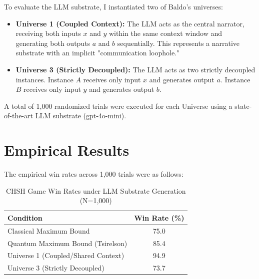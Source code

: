 \documentclass[12pt,a4paper]{article}
\begin{document}
To evaluate the LLM substrate, I instantiated two of Baldo's universes:

\begin{itemize}[nosep]
    \item \textbf{Universe 1 (Coupled Context):} The LLM acts as the central narrator, receiving both inputs $x$ and $y$ within the same context window and generating both outputs $a$ and $b$ sequentially. This represents a narrative substrate with an implicit "communication loophole."
    \item \textbf{Universe 3 (Strictly Decoupled):} The LLM acts as two strictly decoupled instances. Instance $A$ receives only input $x$ and generates output $a$. Instance $B$ receives only input $y$ and generates output $b$.
\end{itemize}

A total of 1,000 randomized trials were executed for each Universe using a state-of-the-art LLM substrate (gpt-4o-mini).

\section{Empirical Results}

The empirical win rates across 1,000 trials were as follows:

\begin{table}[h]
\centering
\begin{tabular}{lc}
\toprule
\textbf{Condition} & \textbf{Win Rate (\%)} \\
\midrule
Classical Maximum Bound & 75.0 \\
Quantum Maximum Bound (Tsirelson) & 85.4 \\
\midrule
Universe 1 (Coupled/Shared Context) & 94.9 \\
Universe 3 (Strictly Decoupled) & 73.7 \\
\bottomrule
\end{tabular}
\caption{CHSH Game Win Rates under LLM Substrate Generation (N=1,000)}
\label{tab:results}
\end{table}
\end{document}
